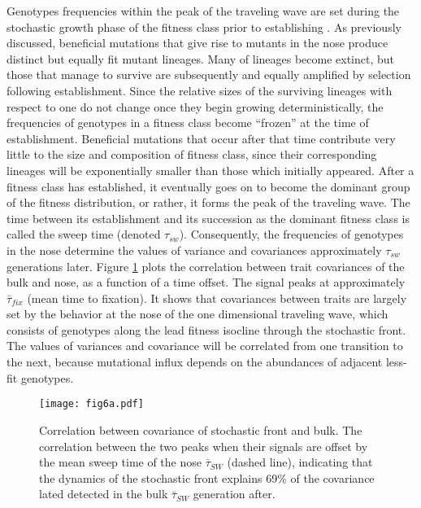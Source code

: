 \documentclass[9pt,twocolumn,twoside]{gsajnl}
\begin{document}
Genotypes frequencies within the peak of the traveling wave are set during the stochastic growth phase of the fitness class prior to establishing \citep{Desai2013}.  As previously discussed, beneficial mutations that give rise to mutants in the nose produce distinct but equally fit mutant lineages. Many of lineages become extinct, but those that manage to survive are subsequently and equally amplified by selection following establishment. Since the relative sizes of the surviving lineages with respect to one do not change once they begin growing deterministically, the frequencies of genotypes in a fitness class become ``frozen'' at the time of establishment. Beneficial mutations that occur after that time contribute very little to the size and composition of fitness class, since their corresponding lineages will be exponentially smaller than those which initially appeared. After a fitness class has established, it eventually goes on to become the dominant group of the fitness distribution, or rather, it forms the peak of the traveling wave. The time between its establishment and its succession as the dominant fitness class is called the sweep time (denoted $\tau_{sw}$). Consequently, the frequencies of genotypes in the nose determine the values of variance and covariances approximately $\tau_{sw}$ generations later. Figure \ref{fig:6} plots the correlation between trait covariances of the bulk and nose, as a function of a time offset. The signal peaks at approximately $\bar{\tau}_{fix}$ (mean time to fixation). It shows that covariances between traits are largely set by the behavior at the nose of the one dimensional traveling wave, which consists of genotypes along the lead fitness isocline through the stochastic front.  The values of variances and covariance will be correlated from one transition to the next, because mutational influx depends on the abundances of adjacent less-fit genotypes.\par

\begin{figure}[!ht]
\texttt{[image: fig6a.pdf]}
\caption{Correlation between covariance of stochastic front and bulk. The correlation between the two peaks when their signals are offset by the mean sweep time of the nose $\bar{\tau}_{SW}$ (dashed line), indicating that the dynamics of the stochastic front explains 69\% of the covariance lated detected in the bulk $\bar{\tau}_{SW}$ generation after.}\label{fig:6}
% 
% 
\end{figure}
\end{document}

